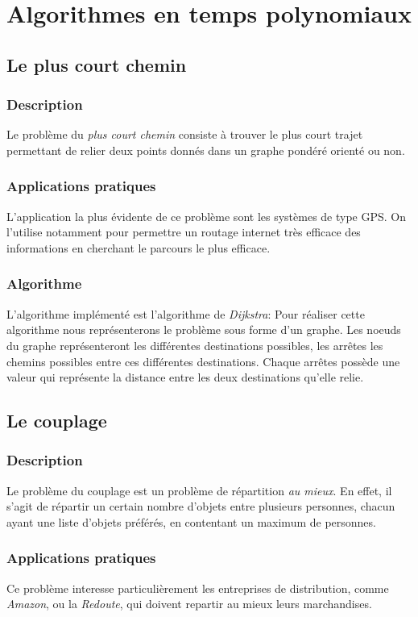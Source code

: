 \section{Algorithmes en temps polynomiaux}
    \subsection{Le plus court chemin}
        \subsubsection{Description}
        Le problème du \emph{plus court chemin} consiste à trouver
        le plus court trajet permettant de relier deux points donnés dans un graphe pondéré orienté ou non.
        \subsubsection{Applications pratiques}
            L'application la plus évidente de ce problème sont les systèmes de type
            GPS. On l'utilise notamment pour permettre un routage internet très efficace 
            des informations en cherchant le parcours le plus efficace.
        \subsubsection{Algorithme}
	L'algorithme implémenté est l'algorithme de \emph{Dijkstra}: 
	Pour réaliser cette algorithme nous représenterons le problème sous 
	forme d'un graphe. Les noeuds du graphe représenteront les différentes destinations possibles, 
	les arrêtes les chemins possibles entre ces différentes destinations. Chaque arrêtes possède 
	une valeur qui représente la distance entre les deux destinations qu'elle relie.
			
    \subsection{Le couplage}
        \subsubsection{Description}
            Le problème du couplage est un problème de répartition \emph{au mieux}.
            En effet, il s'agit de répartir un certain nombre d'objets
            entre plusieurs personnes, chacun ayant une liste d'objets
            préférés, en contentant un maximum de personnes.
        \subsubsection{Applications pratiques}
            Ce problème interesse particulièrement les entreprises
            de distribution, comme \emph{Amazon},
            ou la \emph{Redoute}, qui doivent
            repartir au mieux leurs marchandises.

